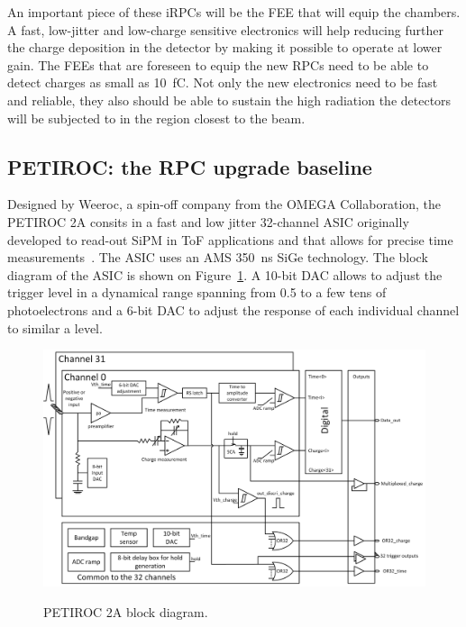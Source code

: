 	An important piece of these iRPCs will be the \acl{FEE} that will equip the chambers. A fast, low-jitter and low-charge sensitive electronics will help reducing further the charge deposition in the detector by making it possible to operate at lower gain. The FEEs that are foreseen to equip the new RPCs need to be able to detect charges as small as \SI{10}{fC}. Not only the new electronics need to be fast and reliable, they also should be able to sustain the high radiation the detectors will be subjected to in the region closest to the beam.
	
	\subsection{PETIROC: the RPC upgrade baseline}
	\label{chapt6:ssec:RPCROC}
	
	Designed by Weeroc, a spin-off company from the OMEGA Collaboration, the PETIROC 2A consits in a fast and low jitter 32-channel ASIC originally developed to read-out \acf{SiPM} in ToF applications and that allows for precise time measurements~\cite{PETIROCIEEE,PETIROCTWEPP}. The ASIC uses an AMS \SI{350}{ns} \acf{SiGe} technology. The block diagram of the ASIC is shown on Figure~\ref{fig:PETIROCASIC}. A 10-bit DAC allows to adjust the trigger level in a dynamical range spanning from 0.5 to a few tens of photoelectrons and a 6-bit DAC to adjust the response of each individual channel to similar a level.
	
	\begin{figure}[H]
		\centering
		\includegraphics[width = \linewidth]{fig/chapt6/petiroc2.png}\\
		\caption{\label{fig:PETIROCASIC} PETIROC 2A block diagram.}
	\end{figure}
	
